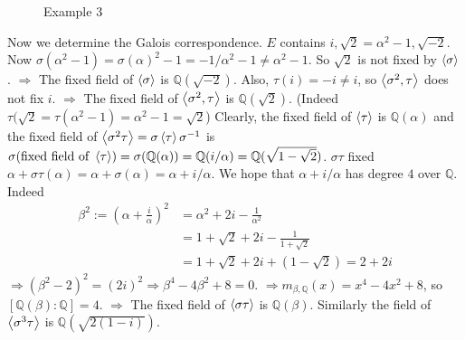 \documentclass{article}
\theoremstyle{definition}
\newcommand{\QQ}{\mathbb Q}
\newcommand{\Ra}{\Rightarrow}
\begin{document}
\begin{enumerate}
\begin{figure}[H]
					\caption{Example 3}
				\end{figure}
		
		\par Now we determine the Galois correspondence.
		$E$ contains $i, \sqrt{2} = \alpha^2 - 1, \sqrt{-2}$.
		Now $\sigma(\alpha^2 - 1) = \sigma(\alpha)^2 - 1 = -1/\alpha^2 - 1 \neq \alpha^2 - 1$.
		So $\sqrt{2}$ is not fixed by $\ev{\sigma}$.
		$\Ra$ The fixed field of $\ev{\sigma}$ is $\QQ(\sqrt{-2})$.
		Also, $\tau(i) = -i \neq i$, so $\ev{\sigma^2, \tau}$ does not fix $i$.
		$\Ra$ The fixed field of $\ev{\sigma^2, \tau}$ is $\QQ(\sqrt{2})$.
		(Indeed $\tau(\sqrt{2} = \tau(\alpha^2 - 1) = \alpha^2 - 1 = \sqrt{2}$)
		Clearly, the fixed field of $\ev{\tau}$ is $\QQ(\alpha)$ and the fixed field of $\ev{\sigma^2 \tau} = \sigma \ev{\tau} \sigma^{-1}$ is $\sigma(\text{fixed field of }\ev{\tau}) = \sigma(\QQ(\alpha)) = \QQ(i/\alpha) = \QQ(\sqrt{1 - \sqrt{2}})$.
		$\sigma \tau$ fixed $\alpha + \sigma \tau(\alpha) = \alpha + \sigma(\alpha) = \alpha + i/\alpha$.
		We hope that $\alpha + i/\alpha$ has degree $4$ over $\QQ$.
		Indeed 
		\[
			\begin{split}
				\beta^2 := \left(\alpha + \frac{i}{\alpha}\right)^2 &= \alpha^2 + 2 i - \frac{1}{\alpha^2}\\
				&= 1 + \sqrt{2} + 2i - \frac{1}{1 +  \sqrt{2}}\\
				&= 1 + \sqrt{2} + 2i + (1 - \sqrt{2}) = 2 + 2i
			\end{split}
		\]
		$\Ra (\beta^2 - 2)^2 = (2i)^2 \Ra \beta^4 - 4 \beta^2 + 8 = 0$.
		$\Ra m_{\beta, \QQ}(x) = x^4 - 4x^2 + 8$, so $[\QQ(\beta):\QQ] = 4$.
		$\Ra$ The fixed field of $\ev{\sigma \tau}$ is $\QQ(\beta)$.
		Similarly the field of $\ev{\sigma^3 \tau}$ is $\QQ(\sqrt{2(1 - i)})$.

\end{enumerate}
\end{document}
